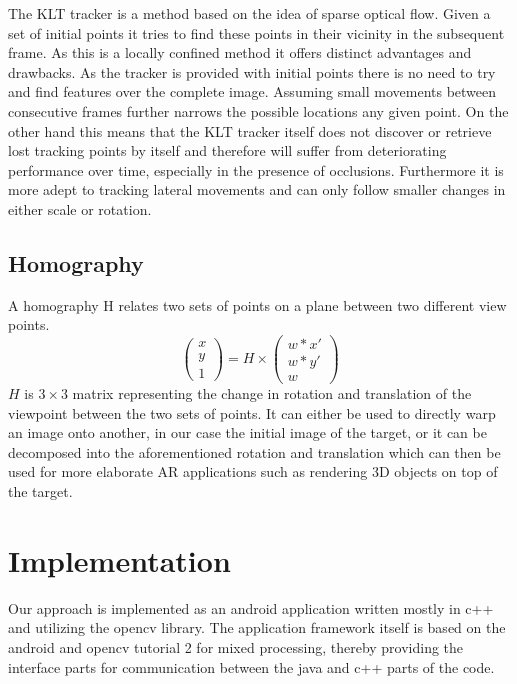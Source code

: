 \documentclass[10pt,conference,compsocconf]{IEEEtran}
\begin{document}
The KLT tracker is a method based on the idea of sparse optical flow. Given a set of initial points it tries to find these points in their vicinity in the subsequent frame. As this is a locally confined method it offers distinct advantages and drawbacks. As the tracker is provided with initial points there is no need to try and find features over the complete image. Assuming small movements between consecutive frames further narrows the possible locations any given point. On the other hand this means that the KLT tracker itself does not discover or retrieve lost tracking points by itself and therefore will suffer from deteriorating performance over time, especially in the presence of occlusions. Furthermore it is more adept to tracking lateral movements and can only follow smaller changes in either scale or rotation. 

\subsection{Homography}

A homography H relates two sets of points on a plane between two different view points. 
\begin{equation}
\left( \begin{array}{c} x \\ y \\ 1 \end{array} \right) = H  \times \left( \begin{array}{c} w*x' \\ w*y' \\ w \end{array} \right)
\end{equation}
$H$ is $3\times3$ matrix representing the change in rotation and translation of the viewpoint between the two sets of points. It can either be used to directly warp an image onto another, in our case the initial image of the target, or it can be decomposed into the aforementioned rotation and translation which can then be used for more elaborate AR applications such as rendering 3D objects on top of the target. 

\section{Implementation}

Our approach is implemented as an android application written mostly in c++ and utilizing the opencv library. The application framework itself is based on the android and opencv tutorial 2 for mixed processing, thereby providing the interface parts for communication between the java and c++ parts of the code. 
\end{document}
